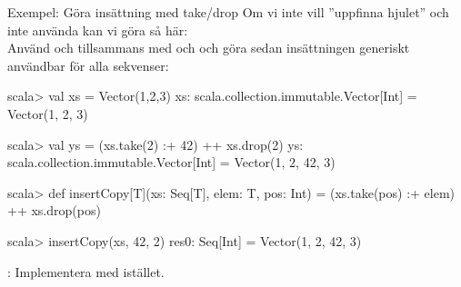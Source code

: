 \begin{Slide}{Exempel: Göra insättning med take/drop}\SlideFontSmall
Om vi inte vill ''uppfinna hjulet'' och inte använda  kan vi göra så här: \\Använd  och  tillsammans med \code{:+} och \code{++} och göra sedan insättningen generiskt användbar för alla sekvenser:
\begin{REPLnonum}
scala> val xs = Vector(1,2,3)
xs: scala.collection.immutable.Vector[Int] = 
  Vector(1, 2, 3)

scala> val ys = (xs.take(2) :+ 42) ++ xs.drop(2)
ys: scala.collection.immutable.Vector[Int] = 
  Vector(1, 2, 42, 3)
  
scala> def insertCopy[T](xs: Seq[T], elem: T, pos: Int) = 
        (xs.take(pos) :+ elem) ++ xs.drop(pos)

scala> insertCopy(xs, 42, 2)
res0: Seq[Int] = Vector(1, 2, 42, 3)
  
\end{REPLnonum}
: Implementera  med  istället.
\end{Slide}







\fi







